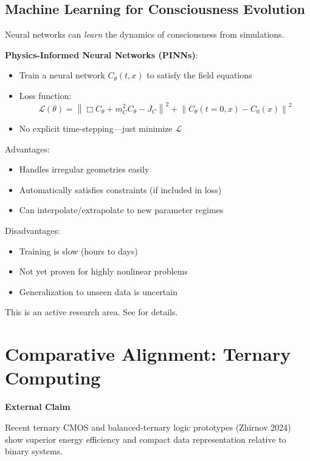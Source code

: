 \begin{advanced}
\subsection{Machine Learning for Consciousness Evolution}

Neural networks can \textit{learn} the dynamics of consciousness from simulations.

\textbf{Physics-Informed Neural Networks (PINNs)}:
\begin{itemize}
\item Train a neural network $C_\theta(t, x)$ to satisfy the field equations
\item Loss function:
\begin{equation}
\mathcal{L}(\theta) = \left\| \Box C_\theta + m_C^2 C_\theta - J_C \right\|^2 + \left\| C_\theta(t=0, x) - C_0(x) \right\|^2
\end{equation}
\item No explicit time-stepping—just minimize $\mathcal{L}$
\end{itemize}

Advantages:
\begin{itemize}
\item Handles irregular geometries easily
\item Automatically satisfies constraints (if included in loss)
\item Can interpolate/extrapolate to new parameter regimes
\end{itemize}

Disadvantages:
\begin{itemize}
\item Training is slow (hours to days)
\item Not yet proven for highly nonlinear problems
\item Generalization to unseen data is uncertain
\end{itemize}

This is an active research area. See \cite{raissi_physics_2019} for details.
\end{advanced}

\section{Comparative Alignment: Ternary Computing}

\textbf{External Claim}

Recent ternary CMOS and balanced-ternary logic prototypes (Zhirnov 2024) show superior energy efficiency and compact data representation relative to binary systems.

